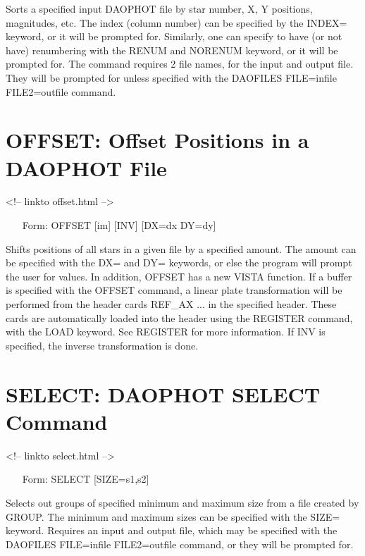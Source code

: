 Sorts a specified input DAOPHOT file by star number, X, Y positions,
magnitudes, etc. The index (column number) can be specified by the INDEX=
keyword, or it will be prompted for. Similarly, one can specify to have
(or not have) renumbering with the RENUM and NORENUM keyword, or it
will be prompted for. The command requires 2 file names, for the input
and output file.  They will be prompted for unless specified with the
DAOFILES FILE=infile FILE2=outfile command.

\section{OFFSET: Offset Positions in a DAOPHOT File}
\begin{rawhtml}
<!-- linkto offset.html -->
\end{rawhtml}
\begin{itemize}
  \item[Form: OFFSET {[im]} {[INV]} {[DX=dx DY=dy]}\hfill]{}
\end{itemize}

Shifts positions of all stars in a given file by a specified amount. The
amount can be specified with the DX= and DY= keywords, or else the program
will prompt the user for values. In addition, OFFSET has a new VISTA
function. If a buffer is specified with the OFFSET command, a linear plate
transformation will be performed from the header cards REF\_AX ... in the
specified header. These cards are automatically loaded into the header
using the REGISTER command, with the LOAD keyword. See REGISTER for more
information.  If INV is specified, the inverse transformation is done.

\section{SELECT: DAOPHOT SELECT Command}
\begin{rawhtml}
<!-- linkto select.html -->
\end{rawhtml}
\begin{itemize}
  \item[Form: SELECT {[SIZE=s1,s2]}\hfill]{}
\end{itemize}

Selects out groups of specified minimum and maximum size from a file
created by GROUP. The minimum and maximum sizes can be specified with the
SIZE= keyword. Requires an input and output file, which may be specified
with the DAOFILES FILE=infile FILE2=outfile command, or they will be
prompted for.

